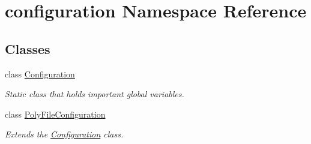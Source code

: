 \hypertarget{namespaceconfiguration}{\section{configuration Namespace Reference}
\label{namespaceconfiguration}
}
\subsection*{Classes}
\begin{DoxyCompactItemize}
\item 
class \hyperlink{classconfiguration_1_1Configuration}{Configuration}
\begin{DoxyCompactList}\small\item\em Static class that holds important global variables. \end{DoxyCompactList}\item 
class \hyperlink{classconfiguration_1_1PolyFileConfiguration}{Poly\-File\-Configuration}
\begin{DoxyCompactList}\small\item\em Extends the \hyperlink{classconfiguration_1_1Configuration}{Configuration} class. \end{DoxyCompactList}\end{DoxyCompactItemize}
